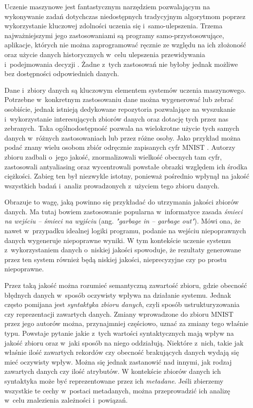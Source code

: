 Uczenie maszynowe jest fantastycznym narzędziem pozwalającym na wykonywanie zadań dotychczas niedostępnych tradycyjnym algorytmom poprzez wykorzystanie kluczowej zdolności uczenia się i~samo-ulepszenia.
Trzema najważniejszymi jego zastosowaniami są programy samo-przystosowujące, aplikacje, których nie można zaprogramować ręcznie ze względu na ich złożoność oraz użycie danych historycznych w~celu ulepszenia przewidywania i~podejmowania decyzji \cite{mitchell1997machine}.
Żadne z~tych zastosowań nie byłoby jednak możliwe bez dostępności odpowiednich danych.

Dane i~zbiory danych są kluczowym elementem systemów uczenia maszynowego.
Potrzebne w~konkretnym zastosowaniu dane można wygenerować lub zebrać osobiście, jednak istnieją dedykowane repozytoria pozwalające na wyszukanie i~wykorzystanie interesujących zbiorów danych oraz dotację tych przez nas zebranych.
Taka ogólnodostępność pozwala na wielokrotne użycie tych samych danych w~różnych zastosowaniach lub przez różne osoby.
Jako przykład można podać znany wielu osobom zbiór odręcznie zapisanych cyfr MNIST \cite{mnist}.
Autorzy zbioru zadbali o~jego jakość, znormalizowali wielkość obecnych tam cyfr, zastosowali antyaliasing oraz wycentrowali powstałe obrazki względem ich środka ciężkości.
Zabieg ten był niezwykle istotny, ponieważ pośrednio wpłynął na jakość wszystkich badań i~analiz prowadzonych z~użyciem tego zbioru danych.

Obrazuje to wagę, jaką powinno się przykładać do utrzymania jakości zbiorów danych.
Ma tutaj bowiem zastosowanie popularna w~informatyce zasada \textit{śmieci na wejściu -- śmieci na wyjściu} (ang. \textit{"garbage in -- garbage out"}).
Mówi ona, że nawet w~przypadku idealnej logiki programu, podanie na wejściu niepoprawnych danych wygeneruje niepoprawne wyniki.
W tym kontekście uczenie systemu z~wykorzystaniem danych o~niskiej jakości spowoduje, że rezultaty generowane przez ten system również będą niskiej jakości, nieprecyzyjne czy po prostu niepoprawne.

Przez taką jakość można rozumieć semantyczną zawartość zbioru, gdzie obecność błędnych danych w~sposób oczywisty wpływa na działanie systemu.
Jednak często pomijana jest \textit{syntaktyka zbioru danych}, czyli sposób ustrukturyzowania czy reprezentacji zawartych danych.
Zmiany wprowadzone do zbioru MNIST przez jego autorów można, przynajmniej częściowo, uznać za zmiany tego właśnie typu.
Powstaje pytanie jakie z~tych wartości syntaktycznych mają wpływ na jakość zbioru oraz w~jaki sposób na niego oddziałują.
Niektóre z~nich, takie jak właśnie ilość zawartych rekordów czy obecność brakujących danych wydają się mieć oczywisty wpływ.
Można się jednak zastanowić nad innymi, jak rodzaj zawartych danych czy ilość atrybutów.
W kontekście zbiorów danych ich syntaktyka może być reprezentowane przez ich \textit{metadane}.
Jeśli zbierzemy wszystkie te cechy w~postaci metadanych, można przeprowadzić ich analizę w~celu znalezienia zależności i~powiązań.


